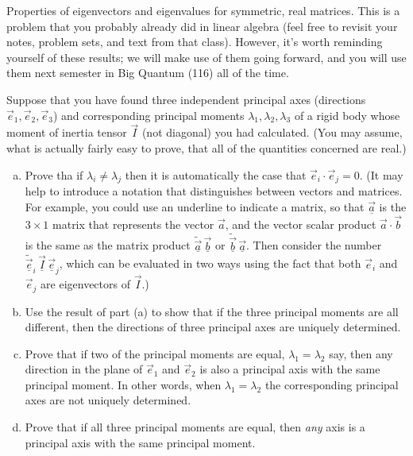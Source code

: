 \documentclass[11pt,letterpaper,boxed]{../hmcpsetrhino}
\newcommand\mat[1]{\underline{\vec {#1}}}
\newcommand\tp[1]{\widetilde {#1}}
\begin{document}
\newpage 

\begin{problem}[ii]
Properties of eigenvectors and eigenvalues for symmetric, real matrices. This is a problem that you probably already did in linear algebra (feel free to revisit your notes, problem sets, and text from that class). However, it's worth reminding yourself of these results; we will make use of them going forward, and you will use them next semester in Big Quantum (116) all of the time.

\begin{problem}[10.38]
Suppose that you have found three independent principal axes (directions $\vec e_1, \vec e_2, \vec e_3$) and corresponding principal moments $\lambda_1, \lambda_2, \lambda_3$ of a rigid body whose moment of inertia tensor $\vec I$ (not diagonal) you had calculated. (You may assume, what is actually fairly easy to prove, that all of the quantities concerned are real.)
\begin{enumerate}[(a)]
\item Prove tha if $\lambda_i \neq \lambda_j$ then it is automatically the case that $\vec e_i \cdot \vec e_j = 0$. (It may help to introduce a notation that distinguishes between vectors and matrices. For example, you could use an underline to indicate a matrix, so that $\mat a$ is the $3 \times 1$ matrix that represents the vector $\vec a$, and the vector scalar product $\vec a \cdot \vec b$ is the same as the matrix product $\tp{\mat a}\,  \mat b$ or $\tp{\mat b}\, \mat a$. Then consider the number $\tp{\mat e}_i\, \mat I \, \mat e_j$, which can be evaluated in two ways using the fact that both $\vec e_i$ and $\vec e_j$ are eigenvectors of $\vec I$.)

\item Use the result of part (a) to show that if the three principal moments are all different, then the directions of three principal axes are uniquely determined. 

\item Prove that if two of the principal moments are equal, $\lambda_1 = \lambda_2$ say, then any direction in the plane of $\vec e_1$ and $\vec e_2$ is also a principal axis with the same principal moment. In other words, when $\lambda_1 = \lambda_2$ the corresponding principal axes are not uniquely determined.

\item Prove that if all three principal moments are equal, then \textit{any} axis is a principal axis with the same principal moment.
\end{enumerate}
\end{problem}
\end{problem}
\begin{solution}

\vfill
\end{solution}
\end{document}
